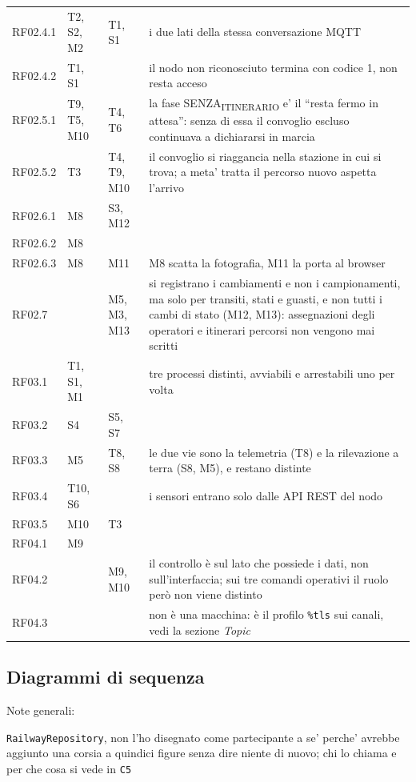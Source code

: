 \documentclass[11pt]{article}
\begin{document}
{\begin{longtable}{L{0.13\textwidth}L{0.13\textwidth}L{0.13\textwidth}L{0.48\textwidth}}
RF02.4.1 & T2, S2, M2 & T1, S1 & i due lati della stessa conversazione MQTT\\
RF02.4.2 & T1, S1 &  & il nodo non riconosciuto termina con codice 1, non resta acceso\\
RF02.5.1 & T9, T5, M10 & T4, T6 & la fase SENZA\textsubscript{ITINERARIO} e' il ``resta fermo in attesa'': senza di essa il convoglio escluso continuava a dichiararsi in marcia\\
RF02.5.2 & T3 & T4, T9, M10 & il convoglio si riaggancia nella stazione in cui si trova; a meta' tratta il percorso nuovo aspetta l'arrivo\\
RF02.6.1 & M8 & S3, M12 & \\
RF02.6.2 & M8 &  & \\
RF02.6.3 & M8 & M11 & M8 scatta la fotografia, M11 la porta al browser\\
RF02.7 &  & M5, M3, M13 & si registrano i cambiamenti e non i campionamenti, ma solo per transiti, stati e guasti, e non tutti i cambi di stato (M12, M13): assegnazioni degli operatori e itinerari percorsi non vengono mai scritti\\
RF03.1 & T1, S1, M1 &  & tre processi distinti, avviabili e arrestabili uno per volta\\
RF03.2 & S4 & S5, S7 & \\
RF03.3 & M5 & T8, S8 & le due vie sono la telemetria (T8) e la rilevazione a terra (S8, M5), e restano distinte\\
RF03.4 & T10, S6 &  & i sensori entrano solo dalle API REST del nodo\\
RF03.5 & M10 & T3 & \\
RF04.1 & M9 &  & \\
RF04.2 &  & M9, M10 & il controllo è sul lato che possiede i dati, non sull'interfaccia; sui tre comandi operativi il ruolo però non viene distinto\\
RF04.3 &  &  & non è una macchina: è il profilo \texttt{\%tls} sui canali, vedi la sezione \emph{Topic}\\
\end{longtable}}
\subsection{Diagrammi di sequenza}
\label{sec:org4c0a8c9}

Note generali:

\texttt{RailwayRepository}, non l'ho disegnato come
partecipante a se' perche' avrebbe aggiunto una corsia a quindici figure senza dire niente di
nuovo; chi lo chiama e per che cosa si vede in \texttt{C5}
\end{document}
